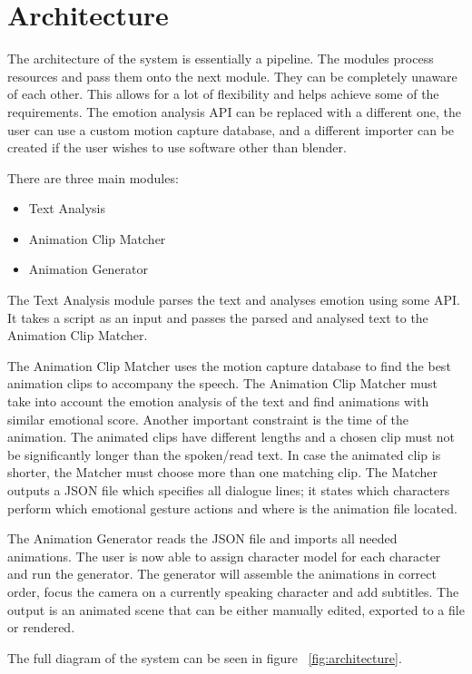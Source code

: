 \section{Architecture}

The architecture of the system is essentially a pipeline. The modules process resources and pass them onto the next module. They can be completely unaware of each other. This allows for a lot of flexibility and helps achieve some of the requirements. The emotion analysis API can be replaced with a different one, the user can use a custom motion capture database, and a different importer can be created if the user wishes to use software other than blender.


There are three main modules:
\begin{itemize}
\item Text Analysis
\item Animation Clip Matcher
\item Animation Generator
\end{itemize}

The Text Analysis module parses the text and analyses emotion using some API. It takes a script as an input and passes the parsed and analysed text to the Animation Clip Matcher.

The Animation Clip Matcher uses the motion capture database to find the best animation clips to accompany the speech. The Animation Clip Matcher must take into account the emotion analysis of the text and find animations with similar emotional score. Another important constraint is the time of the animation. The animated clips have different lengths and a chosen clip must not be significantly longer than the spoken/read text. In case the animated clip is shorter, the Matcher must choose more than one matching clip. The Matcher outputs a JSON file which specifies all dialogue lines; it states which characters perform which emotional gesture actions and where is the animation file located.

The Animation Generator reads the JSON file and imports all needed animations. The user is now able to assign character model for each character and run the generator. The generator will assemble the animations in correct order, focus the camera on a currently speaking character and add subtitles. The output is an animated scene that can be either manually edited, exported to a file or rendered.

The full diagram of the system can be seen in figure ~\ref{fig:architecture}.

